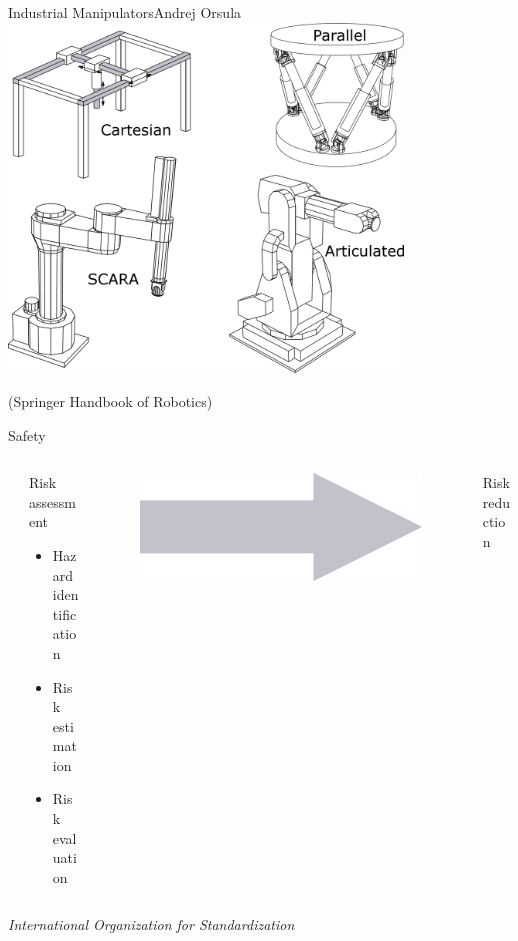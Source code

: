 \begin{frame}{Industrial Manipulators}{Andrej Orsula}
\centering
\includegraphics[width=0.785\textwidth]{graphics/andrej/indu_mani}

\tiny{(Springer Handbook of Robotics)}
\end{frame}



\begin{frame}{Safety}
\begin{columns}
\begin{column}{0.05\textwidth}
\end{column}
\begin{column}{0.40\textwidth}
Risk assessment
    \begin{itemize}
        \item Hazard identification
        \item Risk estimation
        \item Risk evaluation     
    \end{itemize}
\end{column}
\begin{column}{0.25\textwidth}
\begin{figure}[]
    \centering
    \includegraphics[width=.9\textwidth]{graphics/andrej/arrow}
    \newline
\end{figure}
\end{column}
\begin{column}{0.3\textwidth}
Risk reduction
\end{column}
\end{columns}
\vspace{10mm}
\centering
\textit{International Organization for Standardization}
\end{frame}


